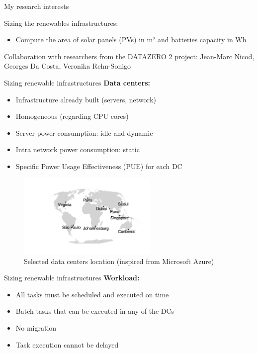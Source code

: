 \documentclass[Ligatures=TeX,table,svgnames,usetotalslideindicator,compress,10pt]{beamer}
\begin{document}
\begin{frame}{My research interests}

  Sizing the renewables infrastructures:
  
  \begin{itemize}
      
  \item Compute the area of solar panels (PVs) in m² and batteries capacity in Wh
  
  \end{itemize}

  Collaboration with researchers from the DATAZERO 2 project:
  Jean-Marc Nicod, Georges Da Costa, Veronika Rehn-Sonigo

\end{frame}



\begin{frame}{Sizing renewable infrastructures}  
  \textbf{Data centers:}
  
  \begin{itemize}

  \item Infrastructure already built (servers, network)
  \item Homogeneous (regarding CPU cores)
  \item Server power consumption: idle and dynamic 
  \item Intra network power consumption: static 
  \item Specific Power Usage Effectiveness (PUE) for each DC

  \end{itemize}

  \begin{figure}[!h]
    \centering
    \includegraphics[width=0.6\textwidth]{images/locations_.pdf}
    \caption{Selected data centers location (inspired from Microsoft Azure)}
  \end{figure}  
\end{frame}

\begin{frame}{Sizing renewable infrastructures}  
  \textbf{Workload:}
  
  \begin{itemize}  
  \item All tasks must be scheduled and executed on time
  \item Batch tasks that can be executed in any of the DCs 
  \item No migration 
  \item Task execution cannot be delayed
  \end{itemize}

\end{frame}
\end{document}
